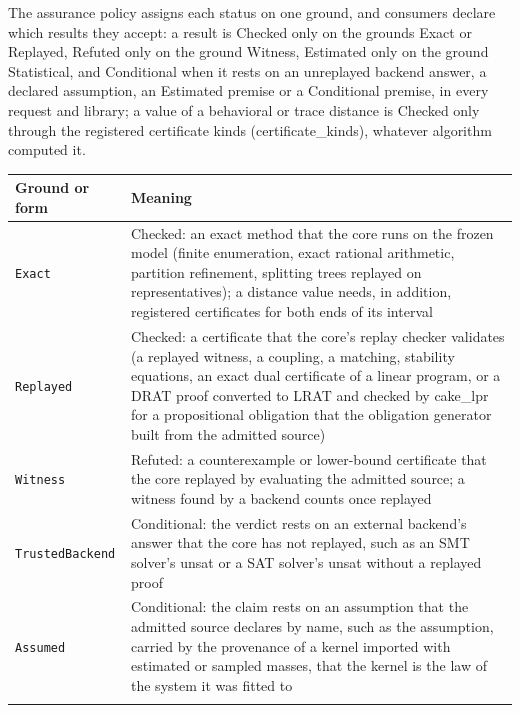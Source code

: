 \documentclass[11pt]{article}
\newcommand{\code}[1]{\texttt{#1}}
\theoremstyle{definition}
\theoremstyle{plain}
\begin{document}
The assurance policy assigns each status on one ground, and consumers declare which results they accept: a result is Checked only on the grounds Exact or Replayed,\allowbreak{} Refuted only on the ground Witness,\allowbreak{} Estimated only on the ground Statistical,\allowbreak{} and Conditional when it rests on an unreplayed backend answer,\allowbreak{} a declared assumption,\allowbreak{} an Estimated premise or a Conditional premise,\allowbreak{} in every request and library; a value of a behavioral or trace distance is Checked only through the registered certificate kinds (certificate\_kinds),\allowbreak{} whatever algorithm computed it.
{\footnotesize\begin{longtable}{>{\raggedright\arraybackslash}p{5.4cm}>{\raggedright\arraybackslash}p{9.0cm}}
\toprule Ground or form & Meaning\\ \midrule \endhead
\code{Exact} & Checked: an exact method that the core runs on the frozen model (finite enumeration,\allowbreak{} exact rational arithmetic,\allowbreak{} partition refinement,\allowbreak{} splitting trees replayed on representatives); a distance value needs,\allowbreak{} in addition,\allowbreak{} registered certificates for both ends of its interval\\ \addlinespace[3pt]
\code{Replayed} & Checked: a certificate that the core's replay checker validates (a replayed witness,\allowbreak{} a coupling,\allowbreak{} a matching,\allowbreak{} stability equations,\allowbreak{} an exact dual certificate of a linear program,\allowbreak{} or a DRAT proof converted to LRAT and checked by cake\_lpr for a propositional obligation that the obligation generator built from the admitted source)\\ \addlinespace[3pt]
\code{Witness} & Refuted: a counterexample or lower-bound certificate that the core replayed by evaluating the admitted source; a witness found by a backend counts once replayed\\ \addlinespace[3pt]
\code{TrustedBackend} & Conditional: the verdict rests on an external backend's answer that the core has not replayed,\allowbreak{} such as an SMT solver's unsat or a SAT solver's unsat without a replayed proof\\ \addlinespace[3pt]
\code{Assumed} & Conditional: the claim rests on an assumption that the admitted source declares by name,\allowbreak{} such as the assumption,\allowbreak{} carried by the provenance of a kernel imported with estimated or sampled masses,\allowbreak{} that the kernel is the law of the system it was fitted to\\ \addlinespace[3pt]

\end{longtable}}
\end{document}
